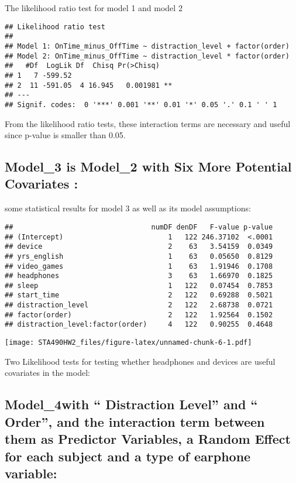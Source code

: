 \documentclass[]{article}
\begin{document}
The likelihood ratio test for model 1 and model 2

\begin{verbatim}
## Likelihood ratio test
## 
## Model 1: OnTime_minus_OffTime ~ distraction_level + factor(order)
## Model 2: OnTime_minus_OffTime ~ distraction_level * factor(order)
##   #Df  LogLik Df  Chisq Pr(>Chisq)   
## 1   7 -599.52                        
## 2  11 -591.05  4 16.945   0.001981 **
## ---
## Signif. codes:  0 '***' 0.001 '**' 0.01 '*' 0.05 '.' 0.1 ' ' 1
\end{verbatim}

From the likelihood ratio tests, these interaction terms are necessary
and useful since p-value is smaller than 0.05.

\hypertarget{model_3-is-model_2-with-six-more-potential-covariates-1}{%
\subsection{Model\_3 is Model\_2 with Six More Potential Covariates
:}\label{model_3-is-model_2-with-six-more-potential-covariates-1}}

some statistical results for model 3 as well as its model assumptions:

\begin{verbatim}
##                                 numDF denDF   F-value p-value
## (Intercept)                         1   122 246.37102  <.0001
## device                              2    63   3.54159  0.0349
## yrs_english                         1    63   0.05650  0.8129
## video_games                         1    63   1.91946  0.1708
## headphones                          3    63   1.66970  0.1825
## sleep                               1   122   0.07454  0.7853
## start_time                          2   122   0.69288  0.5021
## distraction_level                   2   122   2.68738  0.0721
## factor(order)                       2   122   1.92564  0.1502
## distraction_level:factor(order)     4   122   0.90255  0.4648
\end{verbatim}

\texttt{[image: STA490HW2\_files/figure-latex/unnamed-chunk-6-1.pdf]}

Two Likelihood tests for testing whether headphones and devices are
useful covariates in the model:

\hypertarget{model_4with-distraction-level-and-order-and-the-interaction-term-between-them-as-predictor-variables-a-random-effect-for-each-subject-and-a-type-of-earphone-variable-1}{%
\subsection{Model\_4with `` Distraction Level'' and `` Order'', and the
interaction term between them as Predictor Variables, a Random Effect
for each subject and a type of earphone
variable:}\label{model_4with-distraction-level-and-order-and-the-interaction-term-between-them-as-predictor-variables-a-random-effect-for-each-subject-and-a-type-of-earphone-variable-1}}
\end{document}
